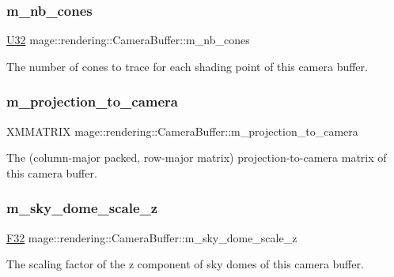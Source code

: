 \subsubsection{\texorpdfstring{m\+\_\+nb\+\_\+cones}{m\_nb\_cones}}
{\footnotesize\ttfamily \hyperlink{namespacemage_a41c104c036fba3756a74e19f793eeaa1}{U32} mage\+::rendering\+::\+Camera\+Buffer\+::m\+\_\+nb\+\_\+cones}

The number of cones to trace for each shading point of this camera buffer. \hypertarget{structmage_1_1rendering_1_1_camera_buffer_a9cb9e0e4005d55b72668bbdcf4a27218}{}\label{structmage_1_1rendering_1_1_camera_buffer_a9cb9e0e4005d55b72668bbdcf4a27218} 
\subsubsection{\texorpdfstring{m\+\_\+projection\+\_\+to\+\_\+camera}{m\_projection\_to\_camera}}
{\footnotesize\ttfamily X\+M\+M\+A\+T\+R\+IX mage\+::rendering\+::\+Camera\+Buffer\+::m\+\_\+projection\+\_\+to\+\_\+camera}

The (column-\/major packed, row-\/major matrix) projection-\/to-\/camera matrix of this camera buffer. \hypertarget{structmage_1_1rendering_1_1_camera_buffer_abfb4dbb9a228b6a7412b09b179fd157d}{}\label{structmage_1_1rendering_1_1_camera_buffer_abfb4dbb9a228b6a7412b09b179fd157d} 
\subsubsection{\texorpdfstring{m\+\_\+sky\+\_\+dome\+\_\+scale\+\_\+z}{m\_sky\_dome\_scale\_z}}
{\footnotesize\ttfamily \hyperlink{namespacemage_aa97e833b45f06d60a0a9c4fc22ae02c0}{F32} mage\+::rendering\+::\+Camera\+Buffer\+::m\+\_\+sky\+\_\+dome\+\_\+scale\+\_\+z}

The scaling factor of the z component of sky domes of this camera buffer. \hypertarget{structmage_1_1rendering_1_1_camera_buffer_a05e17b19f87ca2a5cb5c75cf04e2796c}{}\label{structmage_1_1rendering_1_1_camera_buffer_a05e17b19f87ca2a5cb5c75cf04e2796c} 
